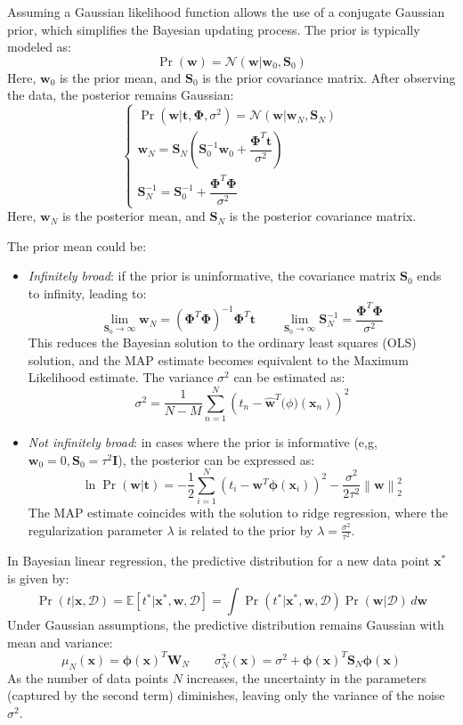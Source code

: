 Assuming a Gaussian likelihood function allows the use of a conjugate Gaussian prior, which simplifies the Bayesian updating process. The prior is typically modeled as:
\[\Pr(\mathbf{w})=\mathcal{N}(\mathbf{w}|\mathbf{w}_0,\mathbf{S}_0)\]
Here, $\mathbf{w}_0$ is the prior mean, and $\mathbf{S}_0$ is the prior covariance matrix.
After observing the data, the posterior remains Gaussian:
\[\begin{cases}
    \Pr(\mathbf{w}|\mathbf{t},\boldsymbol{\Phi},\sigma^2)=\mathcal{N}(\mathbf{w}|\mathbf{w}_N,\mathbf{S}_N) \\
    \mathbf{w}_N=\mathbf{S}_N\left(\mathbf{S}_0^{-1}\mathbf{w}_0+\dfrac{\boldsymbol{\Phi}^T\mathbf{t}}{\sigma^2}\right) \\
    \mathbf{S}_N^{-1}=\mathbf{S}_0^{-1}+\dfrac{\boldsymbol{\Phi}^T\boldsymbol{\Phi}}{\sigma^2}
\end{cases}\]
Here, $\mathbf{w}_N$ is the posterior mean, and $\mathbf{S}_N$ is the posterior covariance matrix.

The prior mean could be: 
\begin{itemize}
    \item \textit{Infinitely broad}: if the prior is uninformative, the covariance matrix $\mathbf{S}_0$ ends to infinity, leading to:
        \[\lim_{\mathbf{S}_0\rightarrow\infty}\mathbf{w}_N={\left( \boldsymbol{\Phi}^T\boldsymbol{\Phi} \right)}^{-1}\boldsymbol{\Phi}^T\mathbf{t} \qquad \lim_{\mathbf{S}_0\rightarrow\infty}\mathbf{S}_N^{-1}=\dfrac{\boldsymbol{\Phi}^T\boldsymbol{\Phi}}{\sigma^2}\]
        This reduces the Bayesian solution to the ordinary least squares (OLS) solution, and the MAP estimate becomes equivalent to the Maximum Likelihood estimate. 
        The variance $\sigma^2$ can be estimated as:
        \[\sigma^2=\dfrac{1}{N-M}\sum_{n=1}^{N}{\left( t_n-\hat{\mathbf{w}}^T\boldsymbol(\phi)(\mathbf{x}_n) \right)}^2\]
    \item \textit{Not infinitely broad}: in cases where the prior is informative (e,g,$\mathbf{w}_0=0,\mathbf{S}_0=\tau^2\mathbf{I}$), the posterior can be expressed as:
        \[\ln\Pr(\mathbf{w}|\mathbf{t})=-\dfrac{1}{2}\sum_{i=1}^{N}{\left(t_i-\mathbf{w}^T\boldsymbol{\phi}(\mathbf{x}_i)\right)}^2-\dfrac{\sigma^2}{2\tau^2}{\left\lVert \mathbf{w}\right\rVert}_2^2 \]
        The MAP estimate coincides with the solution to ridge regression, where the regularization parameter $\lambda$ is related to the prior by $\lambda=\frac{\sigma^2}{\tau^2}$.
\end{itemize}

In Bayesian linear regression, the predictive distribution for a new data point $\mathbf{x}^\ast$ is given by:
\[\Pr(t|\mathbf{x},\mathcal{D})=\mathbb{E}\left[ t^\ast|\mathbf{x}^\ast,\mathbf{w},\mathcal{D} \right] = \int\Pr(t^\ast|\mathbf{x}^\ast,\mathbf{w},\mathcal{D})\Pr(\mathbf{w}|\mathcal{D})\,d\mathbf{w}\]
Under Gaussian assumptions, the predictive distribution remains Gaussian with mean and variance:
\[\mu_N(\mathbf{x})=\boldsymbol{\phi}(\mathbf{x})^T\mathbf{W}_N \qquad\sigma_N^2(\mathbf{x})=\sigma^2+\boldsymbol{\phi}{(\mathbf{x})}^T\mathbf{S}_N\boldsymbol{\phi}(\mathbf{x})\]
As the number of data points $N$ increases, the uncertainty in the parameters (captured by the second term) diminishes, leaving only the variance of the noise $\sigma^2$. 

